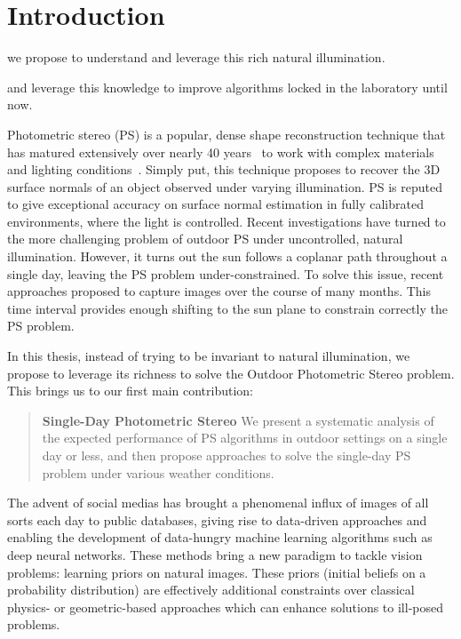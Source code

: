 \chapter*{Introduction}         %



we propose to understand and leverage this rich natural illumination.

and leverage this knowledge to improve algorithms locked in the laboratory until now.

Photometric stereo (PS) is a popular, dense shape reconstruction technique that has matured extensively over nearly 40 years~\cite{woodham-opteng-80} to work with complex materials and lighting conditions~\cite{alldrin-cvpr-08,basri-ijcv-07,johnson-cvpr-11,oxholm-eccv-12}.
Simply put, this technique proposes to recover the 3D surface normals of an object observed under varying illumination.
PS is reputed to give exceptional accuracy on surface normal estimation in fully calibrated environments, where the light is controlled.
Recent investigations have turned to the more challenging problem of outdoor PS under uncontrolled, natural illumination. However, it turns out the sun follows a coplanar path throughout a single day, leaving the PS problem under-constrained. To solve this issue, recent approaches proposed to capture images over the course of many months\cite{ackermann-cvpr-12,abrams-eccv-12}. This time interval provides enough shifting to the sun plane to constrain correctly the PS problem.

In this thesis, instead of trying to be invariant to natural illumination, we propose to leverage its richness to solve the Outdoor Photometric Stereo problem. This brings us to our first main contribution:
\begin{quotation}
\textbf{Single-Day Photometric Stereo} We present a systematic analysis of the expected performance of PS algorithms in outdoor settings on a single day or less, and then propose approaches to solve the single-day PS problem under various weather conditions.
\end{quotation}

The advent of social medias has brought a phenomenal influx of images of all sorts each day to public databases, giving rise to data-driven approaches and enabling the development of data-hungry machine learning algorithms such as deep neural networks. These methods bring a new paradigm to tackle vision problems: learning priors on natural images. These priors (initial beliefs on a probability distribution) are effectively additional constraints over classical physics- or geometric-based approaches which can enhance solutions to ill-posed problems.

